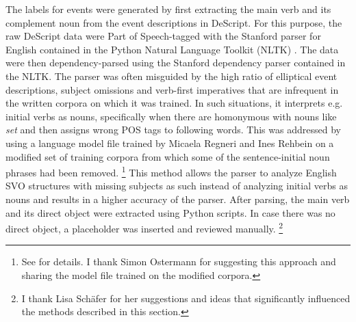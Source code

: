 The labels for events were generated by first extracting the main verb and its complement noun from the event descriptions in DeScript. For this purpose, the raw DeScript data were Part of Speech-tagged with the Stanford parser \citep{klein.manning2003} for English contained in the Python Natural Language Toolkit (NLTK) \citep{loper.bird2002}. The data were then dependency-parsed using the Stanford dependency parser contained in the NLTK. The parser was often misguided by the high ratio of elliptical event descriptions, subject omissions and verb-first imperatives that are infrequent in the written corpora on which it was trained. In such situations, it interprets e.g. initial verbs as nouns, specifically when there are homonymous with nouns like \textit{set} and then assigns wrong POS tags to following words. This was addressed by using a language model file trained by Micaela Regneri and Ines Rehbein on a modified set of training corpora from which some of the sentence-initial noun phrases had been removed.%
%
\footnote{See \citet[49-50]{regneri2013} for details. I thank Simon Ostermann for suggesting this approach and sharing the model file trained on the modified corpora.}\afterfn%
%
This method allows the parser to analyze English SVO structures with missing subjects as such instead of analyzing initial verbs as nouns and results in a higher accuracy of the parser. After parsing, the main verb and its direct object were extracted using Python scripts. In case there was no direct object, a placeholder was inserted and reviewed manually.%
% 
\footnote{I thank Lisa Schäfer for her suggestions and ideas that significantly influenced the methods described in this section.}\afterfn%
%

